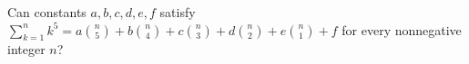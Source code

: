 Can constants $a,b,c,d,e,f$ satisfy $\sum_{k=1}^n k^5=a\binom n5+b\binom n4+c\binom n3+d\binom n2+e\binom n1+f$ for every nonnegative integer $n$?
